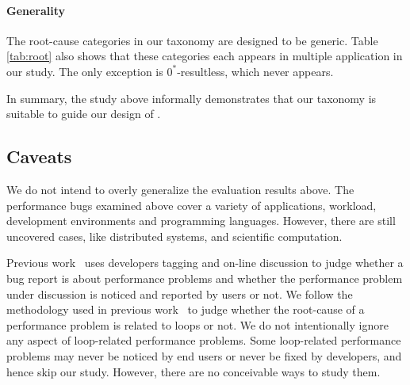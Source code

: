 \paragraph{Generality}
The root-cause categories in our taxonomy are designed to be 
generic. Table \ref{tab:root} also shows that these categories 
each appears in multiple
application in our study. The only exception is $0^*$-resultless, which
never appears. 


In summary, the study above informally demonstrates that our taxonomy
is suitable to guide our design of \Tool.
%

\subsection{Caveats} 
We do not intend to overly generalize the evaluation results above.
The performance bugs examined above cover a variety of applications, workload, 
development environments and programming languages. 
However, there are still uncovered cases, like distributed systems, 
and scientific computation. 

Previous work~\cite{PerfBug, SongOOPSLA2014} uses developers tagging and
on-line discussion to judge whether a bug report is about
performance problems and whether 
the performance problem under discussion is noticed and reported by users
or not.
We follow the methodology used in previous work~\cite{SongOOPSLA2014} to judge 
whether the root-cause of a performance problem is related to loops or not.
We do not intentionally ignore any aspect of loop-related performance problems. 
Some loop-related performance problems may never be noticed by end users
or never be fixed by developers, and hence skip our study. However,
there are no conceivable ways to study them. 

